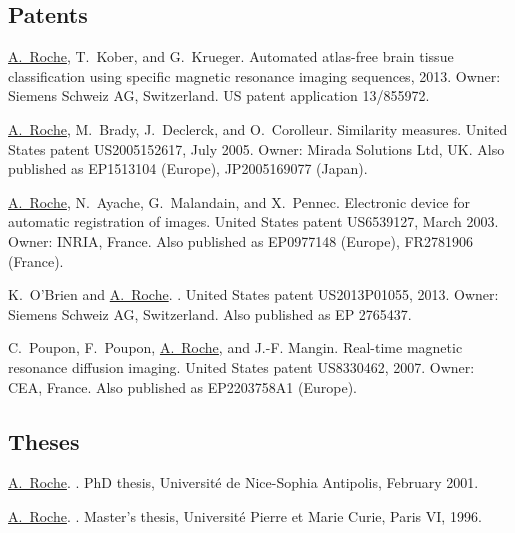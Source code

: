 \begin{thebibliography}{100}
\subsection*{Patents}

\underline{A.~Roche}, T.~Kober, and G.~Krueger.
\newblock Automated atlas-free brain tissue classification using specific
  magnetic resonance imaging sequences, 2013.
\newblock Owner: Siemens Schweiz AG, Switzerland. US patent application
  13/855972.

\underline{A.~Roche}, M.~Brady, J.~Declerck, and O.~Corolleur.
\newblock Similarity measures.
\newblock United States patent US2005152617, July 2005.
\newblock Owner: Mirada Solutions Ltd, UK. Also published as EP1513104
  (Europe), JP2005169077 (Japan).

\underline{A.~Roche}, N.~Ayache, G.~Malandain, and X.~Pennec.
\newblock Electronic device for automatic registration of images.
\newblock United States patent US6539127, March 2003.
\newblock Owner: INRIA, France. Also published as EP0977148 (Europe), FR2781906
  (France).

K.~O'Brien and \underline{A.~Roche}.
.
\newblock United States patent US2013P01055, 2013.
\newblock Owner: Siemens Schweiz AG, Switzerland. Also published as EP 2765437.

C.~Poupon, F.~Poupon, \underline{A.~Roche}, and J.-F. Mangin.
\newblock Real-time magnetic resonance diffusion imaging.
\newblock United States patent US8330462, 2007.
\newblock Owner: CEA, France. Also published as EP2203758A1 (Europe).


\subsection*{Theses}

\underline{A.~Roche}.
.
\newblock PhD thesis, Universit\'e de Nice-Sophia Antipolis, February 2001.

\underline{A.~Roche}.
.
\newblock Master's thesis, {Universit\'e Pierre et Marie Curie, Paris VI},
  1996.

\end{thebibliography}

